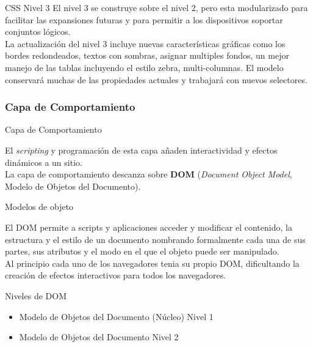 \documentclass{beamer}
\begin{document}
\begin{frame}{CSS Nivel 3} %
    El nivel 3 se construye sobre el nivel 2, pero esta modularizado para
    facilitar las expansiones futuras y para permitir a los dispositivos
    soportar conjuntos lógicos.\\[0.5cm] 

    La actualización del nivel 3 incluye nuevas características gráficas como
    los bordes redondeados, textos con sombras, asignar multiples fondos, un
    mejor manejo de las tablas incluyendo el estilo zebra, multi-columnas. El
    modelo conservará muchas de las propiedades actuales y trabajará con nuevos
    selectores. 
\end{frame}

\subsubsection{Capa de Comportamiento} 

\begin{frame}{Capa de Comportamiento} %
\begin{center}
    
   El \textit{scripting} y programación de esta capa añaden interactividad y
   efectos dinámicos a un sitio. \\[0.5cm]

   La capa de comportamiento descanza sobre \textbf{DOM} (\textit{Document Object
   Model}, Modelo de Objetos del Documento).  
\end{center}
\end{frame}

\begin{frame}{Modelos de objeto} %
\begin{center}
    El DOM permite a scripts y aplicaciones acceder y modificar el contenido,
    la estructura y el estilo de un documento nombrando formalmente cada una de
    sus partes, sus atributos y el modo en el que el objeto puede ser
    manipulado.  \\[0.5cm]

    Al principio cada uno de los navegadores tenia su propio DOM, dificultando
    la creación de efectos interactivos para todos los navegadores. 
\end{center}
\end{frame}

\begin{frame}{Niveles de DOM} %
    \begin{center}
        \begin{itemize}
            \item Modelo de Objetos del Documento (Núcleo) Nivel 1
            \item Modelo de Objetos del Documento Nivel 2
        \end{itemize}
    \end{center}
\end{frame}
\end{document}
